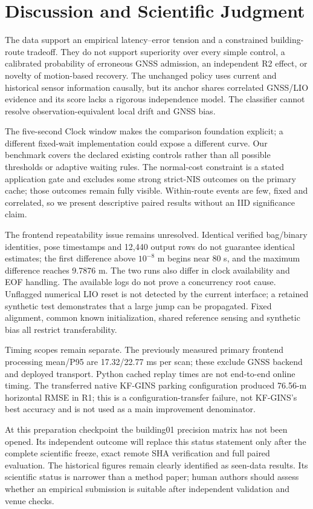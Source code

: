 \documentclass[conference]{IEEEtran}
\begin{document}
\section{Discussion and Scientific Judgment}
The data support an empirical latency--error tension and a constrained building-route tradeoff. They do not support superiority over every simple control, a calibrated probability of erroneous GNSS admission, an independent R2 effect, or novelty of motion-based recovery. The unchanged policy uses current and historical sensor information causally, but its anchor shares correlated GNSS/LIO evidence and its score lacks a rigorous independence model. The classifier cannot resolve observation-equivalent local drift and GNSS bias.

The five-second Clock window makes the comparison foundation explicit; a different fixed-wait implementation could expose a different curve. Our benchmark covers the declared existing controls rather than all possible thresholds or adaptive waiting rules. The normal-cost constraint is a stated application gate and excludes some strong strict-NIS outcomes on the primary cache; those outcomes remain fully visible. Within-route events are few, fixed and correlated, so we present descriptive paired results without an IID significance claim.

The frontend repeatability issue remains unresolved. Identical verified bag/binary identities, pose timestamps and 12,440 output rows do not guarantee identical estimates; the first difference above $10^{-8}$ m begins near 80 s, and the maximum difference reaches 9.7876 m. The two runs also differ in clock availability and EOF handling. The available logs do not prove a concurrency root cause. Unflagged numerical LIO reset is not detected by the current interface; a retained synthetic test demonstrates that a large jump can be propagated. Fixed alignment, common known initialization, shared reference sensing and synthetic bias all restrict transferability.

Timing scopes remain separate. The previously measured primary frontend processing mean/P95 are 17.32/22.77 ms per scan; these exclude GNSS backend and deployed transport. Python cached replay times are not end-to-end online timing. The transferred native KF-GINS parking configuration produced 76.56-m horizontal RMSE in R1; this is a configuration-transfer failure, not KF-GINS's best accuracy and is not used as a main improvement denominator.

At this preparation checkpoint the building01 precision matrix has not been opened. Its independent outcome will replace this status statement only after the complete scientific freeze, exact remote SHA verification and full paired evaluation. The historical figures remain clearly identified as seen-data results. Its scientific status is narrower than a method paper; human authors should assess whether an empirical submission is suitable after independent validation and venue checks.
\end{document}
